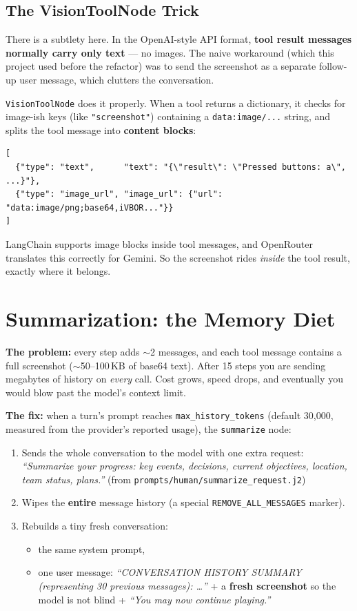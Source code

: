 \documentclass[11pt]{article}
\newcommand{\code}[1]{\texttt{#1}}
\begin{document}
\subsection{The VisionToolNode Trick}

There is a subtlety here. In the OpenAI-style API format, \textbf{tool result messages normally carry only text} --- no images. The naive workaround (which this project used before the refactor) was to send the screenshot as a separate follow-up user message, which clutters the conversation.

\code{VisionToolNode} does it properly. When a tool returns a dictionary, it checks for image-ish keys (like \code{"screenshot"}) containing a \code{data:image/...} string, and splits the tool message into \textbf{content blocks}:

\begin{verbatim}
[
  {"type": "text",      "text": "{\"result\": \"Pressed buttons: a\", ...}"},
  {"type": "image_url", "image_url": {"url": "data:image/png;base64,iVBOR..."}}
]
\end{verbatim}

LangChain supports image blocks inside tool messages, and OpenRouter translates this correctly for Gemini. So the screenshot rides \emph{inside} the tool result, exactly where it belongs.

\section{Summarization: the Memory Diet}
\label{sec:summarization}

\textbf{The problem:} every step adds $\sim$2 messages, and each tool message contains a full screenshot ($\sim$50--100\,KB of base64 text). After 15 steps you are sending megabytes of history on \emph{every} call. Cost grows, speed drops, and eventually you would blow past the model's context limit.

\textbf{The fix:} when a turn's prompt reaches \code{max\_history\_tokens} (default 30{,}000, measured from the provider's reported usage), the \code{summarize} node:

\begin{enumerate}[nosep]
  \item Sends the whole conversation to the model with one extra request: \emph{``Summarize your progress: key events, decisions, current objectives, location, team status, plans.''} (from \code{prompts/human/summarize\_request.j2})
  \item Wipes the \textbf{entire} message history (a special \code{REMOVE\_ALL\_MESSAGES} marker).
  \item Rebuilds a tiny fresh conversation:
    \begin{itemize}[nosep]
      \item the same system prompt,
      \item one user message: \emph{``CONVERSATION HISTORY SUMMARY (representing 30 previous messages): \ldots''} + a \textbf{fresh screenshot} so the model is not blind + \emph{``You may now continue playing.''}
    \end{itemize}
\end{enumerate}
\end{document}
